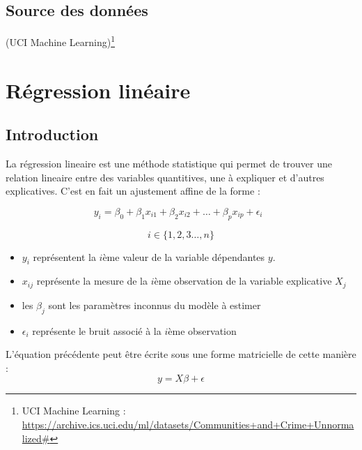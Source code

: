 \documentclass[
]{book}
\providecommand{\tightlist}{%
  \setlength{\itemsep}{0pt}\setlength{\parskip}{0pt}}
\begin{document}
\hypertarget{source-des-donnuxe9es}{%
\section*{Source des données}\label{source-des-donnuxe9es}}

(UCI Machine Learning)\footnote{UCI Machine Learning : \url{https://archive.ics.uci.edu/ml/datasets/Communities+and+Crime+Unnormalized\#}}

\hypertarget{linearModel}{%
\chapter{Régression linéaire}\label{linearModel}}

\hypertarget{introduction-1}{%
\section{Introduction}\label{introduction-1}}

La régression lineaire est une méthode statistique qui permet de trouver une relation lineaire entre des variables quantitives, une à expliquer et d'autres explicatives. C'est en fait un ajustement affine de la forme :

\begin{equation}
y_i = \beta_0 + \beta_1x_{i1} + \beta_2x_{i2} +\dots+\beta_px_{ip}+\epsilon_{i}\;\; 
\end{equation}

\[i\in\{1,2,3\dots,n\}\]

\begin{itemize}
\tightlist
\item
  \(y_i\) représentent la \(i\)ème valeur de la variable dépendantes \(y\).
\item
  \(x_{ij}\) représente la mesure de la \(i\)ème observation de la variable explicative \(X_j\)
\item
  les \(\beta_j\) sont les paramètres inconnus du modèle à estimer
\item
  \(\epsilon_i\) représente le bruit associé à la \(i\)ème observation\\
\end{itemize}

L'équation précédente peut être écrite sous une forme matricielle de cette manière :\\

\begin{equation}
y = X\beta +\epsilon
\end{equation}
\end{document}
